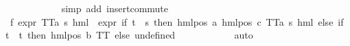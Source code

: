 \begin{isabellebody}
\ \ \ \ \ \ \ \ \ \ \isamarkupfalse%
\ {\isacharparenleft}{\kern0pt}simp\ add{\isacharcolon}{\kern0pt}\ insert{\isacharunderscore}{\kern0pt}commute{\isacharparenright}{\kern0pt}\isanewline
\ \ \ \ \ \ \ \ \isamarkupfalse%
\ f{}{\isacharcolon}{\kern0pt}\ {\isachardoublequoteopen}expr{\isacharunderscore}{\kern0pt}{}\ {\isacharparenleft}{\kern0pt}TT{\isacharcolon}{\kern0pt}{\isacharcolon}{\kern0pt}{\isacharparenleft}{\kern0pt}{\isacharprime}{\kern0pt}a{\isacharcomma}{\kern0pt}\ {\isacharprime}{\kern0pt}s{\isacharparenright}{\kern0pt}\ hml{\isacharparenright}{\kern0pt}\ {\isacharequal}{\kern0pt}\ expr{\isacharunderscore}{\kern0pt}{}\ {\isacharparenleft}{\kern0pt}if\ t\ {\isacharequal}{\kern0pt}\ s\ then\ hml{\isacharunderscore}{\kern0pt}pos\ a\ {\isacharparenleft}{\kern0pt}hml{\isacharunderscore}{\kern0pt}pos\ c\ {\isacharparenleft}{\kern0pt}TT{\isacharcolon}{\kern0pt}{\isacharcolon}{\kern0pt}{\isacharparenleft}{\kern0pt}{\isacharprime}{\kern0pt}a{\isacharcomma}{\kern0pt}\ {\isacharprime}{\kern0pt}s{\isacharparenright}{\kern0pt}\ hml{\isacharparenright}{\kern0pt}{\isacharparenright}{\kern0pt}\ else\ if\ t\ {\isacharequal}{\kern0pt}\ t\ then\ hml{\isacharunderscore}{\kern0pt}pos\ b\ TT\ else\ undefined{\isacharparenright}{\kern0pt}{\isachardoublequoteclose}\isanewline
\ \ \ \ \ \ \ \ \ \ \isamarkupfalse%
\ auto\isanewline
\ \ \ \ \ \ \ \ \isamarkupfalse%

\end{isabellebody}
